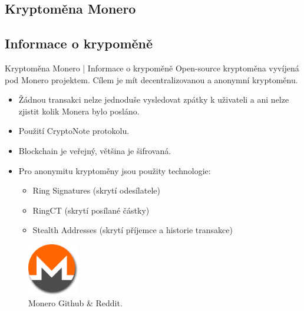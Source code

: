 \documentclass{beamer}
\begin{document}
  \begin{darkframes}
    \section{Kryptoměna Monero}
    \subsection{Informace o krypoměně}
    \begin{frame}{Kryptoměna Monero | Informace o krypoměně}
    Open-source kryptoměna vyvíjená pod Monero projektem.
    Cílem je mít decentralizovanou a anonymní kryptoměnu.
    
\begin{itemize}[<+->]
\item<1-4>  Žádnou transakci nelze jednoduše vysledovat zpátky k uživateli a ani nelze zjistit kolik Monera bylo posláno.
\item<2-4> Použití CryptoNote protokolu.
\item<3-4> Blockchain je veřejný, většina je šifrovaná.
\item<4-4> Pro anonymitu kryptoměny jsou použity technologie: 
\begin{itemize}
\item Ring Signatures (skrytí odesílatele)
\item RingCT (skrytí posílané částky)
\item Stealth Addresses (skrytí příjemce a historie transakce)
\end{itemize}
\end{itemize}    

     \begin{figure}
  \includegraphics[width=0.2\textwidth]{monero-icon.png}
  \caption{Monero Github \& Reddit.}  \label{fig:xray}
\end{figure}
    \end{frame}

\end{darkframes}
\end{document}
